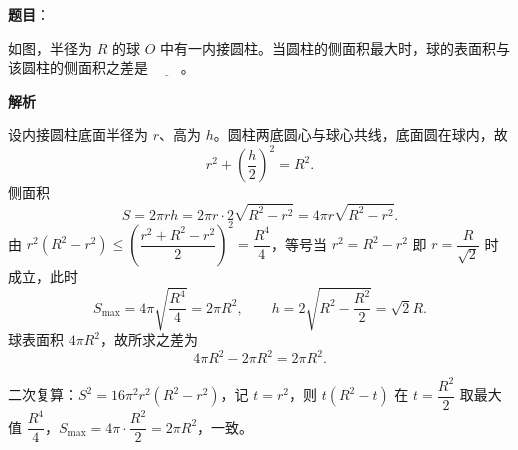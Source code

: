 \begin{answer}

\textbf{题目}：

如图，半径为 $R$ 的球 $O$ 中有一内接圆柱。当圆柱的侧面积最大时，球的表面积与该圆柱的侧面积之差是 $\underline{\qquad}$。
\nopagebreak[4]
\begin{center}\end{center}
\nopagebreak[4]
\textbf{解析}

设内接圆柱底面半径为 $r$、高为 $h$。圆柱两底圆心与球心共线，底面圆在球内，故
\nopagebreak[4]
\[r^2+\left(\frac h2\right)^2=R^2.\]
侧面积
\nopagebreak[4]
\[S=2\pi rh=2\pi r\cdot2\sqrt{R^2-r^2}=4\pi r\sqrt{R^2-r^2}.\]
由 $r^2(R^2-r^2)\leqslant\left(\dfrac{r^2+R^2-r^2}{2}\right)^2=\dfrac{R^4}{4}$，等号当 $r^2=R^2-r^2$ 即 $r=\dfrac{R}{\sqrt2}$ 时成立，此时
\nopagebreak[4]
\[S_{\max}=4\pi\sqrt{\frac{R^4}{4}}=2\pi R^2,\qquad h=2\sqrt{R^2-\frac{R^2}{2}}=\sqrt2R.\]
球表面积 $4\pi R^2$，故所求之差为
\nopagebreak[4]
\[4\pi R^2-2\pi R^2=2\pi R^2.\]

二次复算：$S^2=16\pi^2r^2(R^2-r^2)$，记 $t=r^2$，则 $t(R^2-t)$ 在 $t=\dfrac{R^2}{2}$ 取最大值 $\dfrac{R^4}{4}$，$S_{\max}=4\pi\cdot\dfrac{R^2}{2}=2\pi R^2$，一致。


\end{answer}
